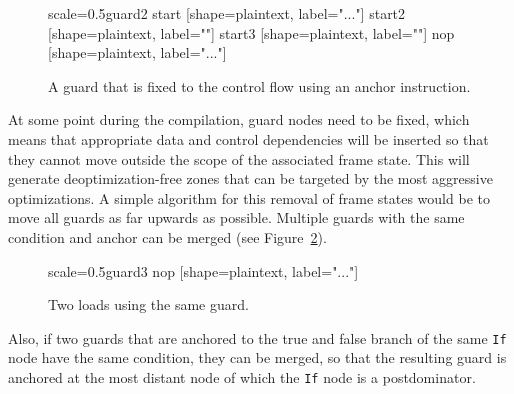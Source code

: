 \documentclass[twocolumn]{svjour3}
\begin{document}
\begin{figure}[h]
  \centering
\begin{digraphenv}{scale=0.5}{guard2}
    start [shape=plaintext, label="..."]
    start2 [shape=plaintext, label=""]
    start3 [shape=plaintext, label=""]
    nop [shape=plaintext, label="..."]
\end{digraphenv}
  \caption{A guard that is fixed to the control flow using an anchor instruction.}
  \label{fig:guard2}
\end{figure}

At some point during the compilation, guard nodes need to be fixed, which means that appropriate data and control dependencies will be inserted so that they cannot move outside the scope of the associated frame state.
This will generate deoptimization-free zones that can be targeted by the most aggressive optimizations.
A simple algorithm for this removal of frame states would be to move all guards as far upwards as possible.
Multiple guards with the same condition and anchor can be merged (see Figure~\ref{fig:guard3}).

\begin{figure}[h]
  \centering
\begin{digraphenv}{scale=0.5}{guard3}
    nop [shape=plaintext, label="..."]
\end{digraphenv}
  \caption{Two loads using the same guard.}
  \label{fig:guard3}
\end{figure}

Also, if two guards that are anchored to the true and false branch of the same \texttt{If} node have the same condition, they can be merged, so that the resulting guard is anchored at the most distant node of which the \texttt{If} node is a postdominator.
\end{document}
